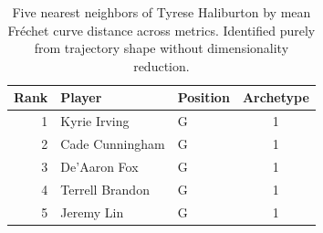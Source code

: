 \begin{table}[htbp]
  \centering\small
  \begin{tabular}{rllc}
    \toprule
    Rank & Player & Position & Archetype \\
    \midrule
    1 & Kyrie Irving & G & 1 \\
    2 & Cade Cunningham & G & 1 \\
    3 & De'Aaron Fox & G & 1 \\
    4 & Terrell Brandon & G & 1 \\
    5 & Jeremy Lin & G & 1 \\
    \bottomrule
  \end{tabular}
  \caption{Five nearest neighbors of Tyrese Haliburton by mean Fr\'{e}chet curve distance across metrics. Identified purely from trajectory shape without dimensionality reduction.}
  \label{tab:Tyrese_Haliburton_frechet_curve_neighbors}
\end{table}

